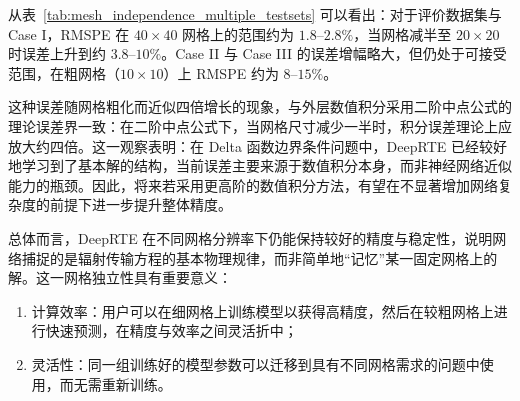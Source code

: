 从表~\ref{tab:mesh_independence_multiple_testsets} 可以看出：对于评价数据集与 Case I，RMSPE 在 $40\times 40$ 网格上的范围约为 $1.8$--$2.8\%$，当网格减半至 $20\times 20$ 时误差上升到约 $3.8$--$10\%$。Case II 与 Case III 的误差增幅略大，但仍处于可接受范围，在粗网格（$10\times 10$）上 RMSPE 约为 $8$--$15\%$。

这种误差随网格粗化而近似四倍增长的现象，与外层数值积分采用二阶中点公式的理论误差界一致：在二阶中点公式下，当网格尺寸减少一半时，积分误差理论上应放大约四倍。这一观察表明：在 Delta 函数边界条件问题中，DeepRTE 已经较好地学习到了基本解的结构，当前误差主要来源于数值积分本身，而非神经网络近似能力的瓶颈。因此，将来若采用更高阶的数值积分方法，有望在不显著增加网络复杂度的前提下进一步提升整体精度。

总体而言，DeepRTE 在不同网格分辨率下仍能保持较好的精度与稳定性，说明网络捕捉的是辐射传输方程的基本物理规律，而非简单地“记忆”某一固定网格上的解。这一网格独立性具有重要意义：
\begin{enumerate}
    \item 计算效率：用户可以在细网格上训练模型以获得高精度，然后在较粗网格上进行快速预测，在精度与效率之间灵活折中；
    \item 灵活性：同一组训练好的模型参数可以迁移到具有不同网格需求的问题中使用，而无需重新训练。
\end{enumerate}
